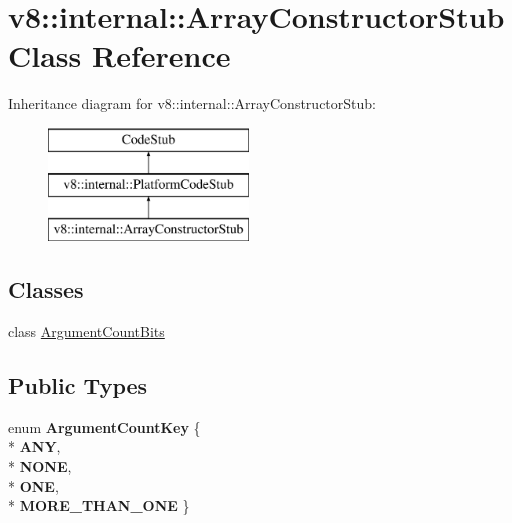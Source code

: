 \hypertarget{classv8_1_1internal_1_1_array_constructor_stub}{}\section{v8\+:\+:internal\+:\+:Array\+Constructor\+Stub Class Reference}
\label{classv8_1_1internal_1_1_array_constructor_stub}
Inheritance diagram for v8\+:\+:internal\+:\+:Array\+Constructor\+Stub\+:\begin{figure}[H]
\begin{center}
\leavevmode
\includegraphics[height=3.000000cm]{classv8_1_1internal_1_1_array_constructor_stub}
\end{center}
\end{figure}
\subsection*{Classes}
\begin{DoxyCompactItemize}
\item 
class \hyperlink{classv8_1_1internal_1_1_array_constructor_stub_1_1_argument_count_bits}{Argument\+Count\+Bits}
\end{DoxyCompactItemize}
\subsection*{Public Types}
\begin{DoxyCompactItemize}
\item 
enum {\bfseries Argument\+Count\+Key} \{ \\*
{\bfseries A\+NY}, 
\\*
{\bfseries N\+O\+NE}, 
\\*
{\bfseries O\+NE}, 
\\*
{\bfseries M\+O\+R\+E\+\_\+\+T\+H\+A\+N\+\_\+\+O\+NE}
 \}\hypertarget{classv8_1_1internal_1_1_array_constructor_stub_ad22d0f4b8c460b9c3cd6f1f96222a05f}{}\label{classv8_1_1internal_1_1_array_constructor_stub_ad22d0f4b8c460b9c3cd6f1f96222a05f}

\end{DoxyCompactItemize}
